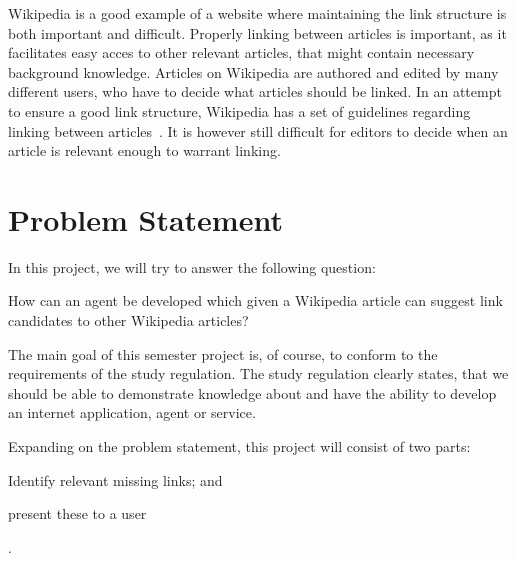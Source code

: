 Wikipedia is a good example of a website where maintaining the link structure is both important and difficult. Properly linking between articles is important, as it facilitates easy acces to other relevant articles, that might contain necessary background knowledge. Articles on Wikipedia are authored and edited by many different users, who have to decide what articles should be linked. In an attempt to ensure a good link structure, Wikipedia has a set of guidelines regarding linking between articles~\cite{wiki-editor-guidelines}. It is however still difficult for editors to decide when an article is relevant enough to warrant linking. 



\section{Problem Statement}

In this project, we will try to answer the following question:

\begin{formal}
How can an agent be developed which given a Wikipedia article can suggest link candidates to other Wikipedia articles?
\end{formal}


The main goal of this semester project is, of course, to conform to the requirements of the study regulation. The study regulation clearly states, that we should be able to demonstrate knowledge about and have the ability to develop an internet application, agent or service. 

Expanding on the problem statement, this project will consist of two parts:
\begin{enumerate*}[label=(\roman*)]
  \item Identify relevant missing links; and
  \item present these to a user
\end{enumerate*}.

